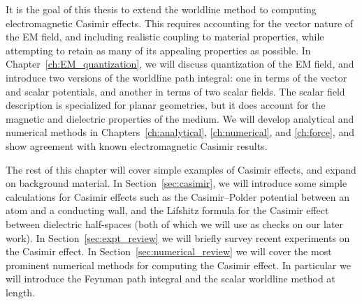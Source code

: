 It is the goal of this thesis to extend the worldline method to computing electromagnetic Casimir effects.
This requires accounting for the vector nature of the EM field, and including realistic coupling to 
material properties, while attempting to retain as many of its appealing properties as possible.    
In Chapter~\ref{ch:EM_quantization}, we will discuss quantization of the EM field, and introduce
two versions of the worldline path integral: one in terms of the vector and scalar potentials, and another 
in terms of two scalar fields.  The scalar field description is specialized for planar geometries, 
but it does account for the magnetic and dielectric properties of the medium.
We will develop analytical and numerical methods in Chapters~\ref{ch:analytical}, \ref{ch:numerical},
and \ref{ch:force}, 
and show agreement with known electromagnetic Casimir results.

The rest of this chapter will cover simple examples of Casimir effects, and expand on background material.
In Section~\ref{sec:casimir}, we will introduce some simple calculations for Casimir effects such as
the Casimir--Polder potential between an atom and a conducting wall, and the Lifshitz formula for the Casimir
effect between dielectric half-spaces (both of which we will use as checks on our later work).
In Section~\ref{sec:expt_review} we will briefly survey recent experiments on the Casimir effect.
In Section~\ref{sec:numerical_review} we will cover the most prominent numerical methods for computing the Casimir effect.
In particular we will introduce the Feynman path integral and the scalar worldline method at length.  


